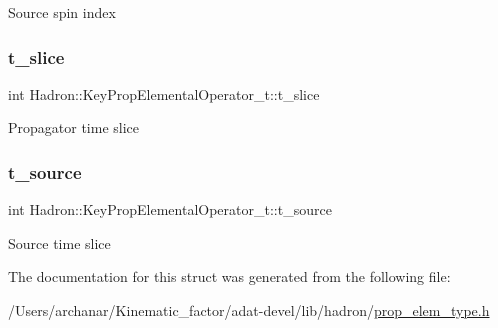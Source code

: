 Source spin index \mbox{\label{structHadron_1_1KeyPropElementalOperator__t_afd52593f348fdfe1a95dc4feec590ed1}} 
\subsubsection{\texorpdfstring{t\_slice}{t\_slice}}
{\footnotesize\ttfamily int Hadron\+::\+Key\+Prop\+Elemental\+Operator\+\_\+t\+::t\+\_\+slice}

Propagator time slice \mbox{\label{structHadron_1_1KeyPropElementalOperator__t_a55ff9327bc33e9bc52d9e5250cd1d0ae}} 
\subsubsection{\texorpdfstring{t\_source}{t\_source}}
{\footnotesize\ttfamily int Hadron\+::\+Key\+Prop\+Elemental\+Operator\+\_\+t\+::t\+\_\+source}

Source time slice 

The documentation for this struct was generated from the following file\+:\begin{DoxyCompactItemize}
\item 
/\+Users/archanar/\+Kinematic\+\_\+factor/adat-\/devel/lib/hadron/\mbox{\hyperlink{adat-devel_2lib_2hadron_2prop__elem__type_8h}{prop\+\_\+elem\+\_\+type.\+h}}\end{DoxyCompactItemize}
